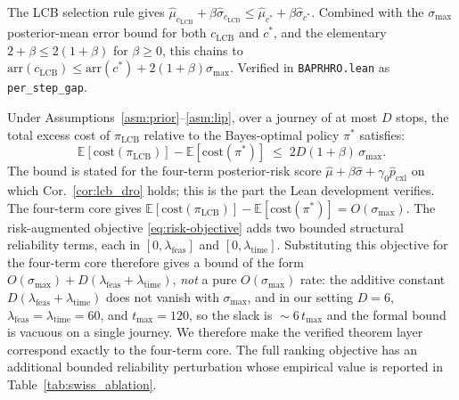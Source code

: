 \documentclass[opre,dblanonrev]{informs4}
\renewenvironment{proof}{\Trivlist\item[\hspace*{1em}\hskip\labelsep{\itshape Proof.\enskip}]\ignorespaces}{\endTrivlist\addvspace{0pt}}
\begin{document}
\begin{proof}[Proof sketch (full proof in EC.\ref{ec:detailed_proofs}).]
The LCB selection rule gives
$\hat\mu_{c_{\mathrm{LCB}}}+\beta\hat\sigma_{c_{\mathrm{LCB}}}\leq
\hat\mu_{c^*}+\beta\hat\sigma_{c^*}$. Combined with the
$\sigma_{\max}$ posterior-mean error bound for both
$c_{\mathrm{LCB}}$ and $c^*$, and the elementary
$2+\beta\leq 2(1+\beta)$ for $\beta\geq 0$, this chains to
$\mathrm{arr}(c_{\mathrm{LCB}})\leq\mathrm{arr}(c^*)+2(1+\beta)\sigma_{\max}$.
Verified in \texttt{BAPRHRO.lean} as \texttt{per\_step\_gap}.
\end{proof}

\begin{theorem}\label{thm:lcb_bound}
Under Assumptions~\ref{asm:prior}--\ref{asm:lip},
over a journey of at most $D$ stops, the total excess cost of $\pi_{\mathrm{LCB}}$
relative to the Bayes-optimal policy $\pi^*$ satisfies:
\begin{equation}
\mathbb{E}[\mathrm{cost}(\pi_{\mathrm{LCB}})] - \mathbb{E}[\mathrm{cost}(\pi^*)]
\;\leq\; 2D(1+\beta)\,\sigma_{\max}.
\label{eq:lcb_bound}
\end{equation}
The bound is stated for the four-term posterior-risk score
$\hat\mu + \beta\hat\sigma + \gamma_0\hat p_{\mathrm{cxl}}$
on which Cor.~\ref{cor:lcb_dro} holds; this is the part the Lean
development verifies. The four-term core gives
$\mathbb{E}[\mathrm{cost}(\pi_{\mathrm{LCB}})] -
\mathbb{E}[\mathrm{cost}(\pi^*)] = O(\sigma_{\max})$. The
risk-augmented objective \eqref{eq:risk-objective} adds two bounded
structural reliability terms, each in
$[0,\lambda_{\mathrm{feas}}]$ and
$[0,\lambda_{\mathrm{time}}]$. Substituting this objective for the
four-term core therefore
gives a bound of the form
$O(\sigma_{\max}) +
D(\lambda_{\mathrm{feas}}+\lambda_{\mathrm{time}})$, \emph{not} a
pure $O(\sigma_{\max})$ rate: the additive constant
$D(\lambda_{\mathrm{feas}}+\lambda_{\mathrm{time}})$
does not vanish with $\sigma_{\max}$, and in our setting
$D{=}6$, $\lambda_{\mathrm{feas}}=\lambda_{\mathrm{time}}=60$, and
$t_{\max}{=}120$, so the slack is
$\!\sim\!6\,t_{\max}$ and the formal bound is vacuous on a single
journey. We therefore make the verified theorem layer correspond
exactly to the four-term core. The full ranking objective has an
additional bounded reliability perturbation whose empirical value is
reported in Table~\ref{tab:swiss_ablation}.
\end{theorem}
\end{document}
